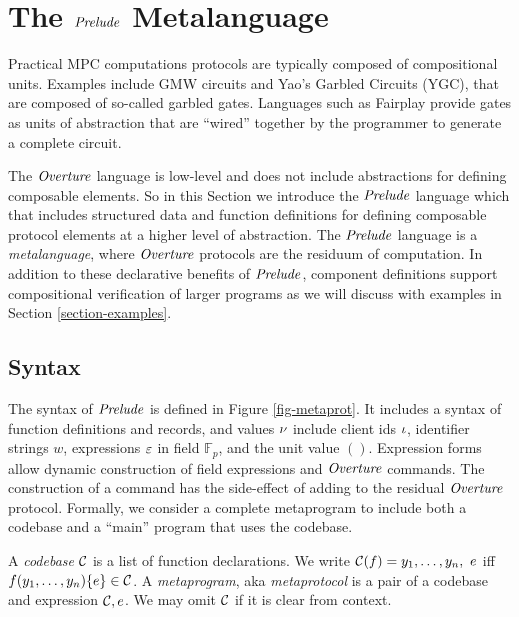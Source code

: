 \section{The $\mathit{Prelude}$ Metalanguage}
\label{section-metalang}

Practical MPC computations protocols are
typically composed of compositional units. Examples include GMW circuits
and Yao's Garbled Circuits (YGC), that are composed of so-called
garbled gates. Languages such as Fairplay \cite{269581} provide gates as
units of abstraction that are ``wired'' together by the programmer to
generate a complete circuit.

The $\mathit{Overture}$ language is low-level and does not include abstractions for
defining composable elements. So in this Section we introduce the $\mathit{Prelude}$
language which that includes structured data and function definitions
for defining composable protocol elements at a higher level of abstraction. 
The $\mathit{Prelude}$ language is a \emph{metalanguage}, where 
$\mathit{Overture}$ protocols are the residuum of computation. In addition to these
declarative benefits of $\mathit{Prelude}$, component
definitions support compositional verification of larger programs as we will
discuss with examples in Section
\ref{section-examples}.

\metaprotfig

\subsection{Syntax}

The syntax of $\mathit{Prelude}$ is defined in Figure
\ref{fig-metaprot}.  It includes a syntax of function
definitions and records, and values $\nu$ include client ids $\iota$, identifier
strings $w$, expressions $\varepsilon$ in field $\mathbb{F}_p$, and the unit value $()$.
Expression forms allow dynamic construction of field expressions and $\mathit{Overture}$ commands.
The construction of a command has the side-effect of adding to the residual
$\mathit{Overture}$ protocol. Formally, we consider a complete metaprogram to include both a
codebase and a ``main'' program that uses the codebase. 
\begin{definition}
A \emph{codebase} $\mathcal{C}$ is a list of function 
declarations. We write $ \mathcal{C}(f) = y_1,\ldots,y_n,\ e$
iff $f(y_1,\ldots,y_n) \{ e \} \in \mathcal{C}$.
A \emph{metaprogram}, aka \emph{metaprotocol}  is a pair of a 
codebase and expression $\mathcal{C}, e$. We may omit
$\mathcal{C}$ if it is clear from context.  
\end{definition}

